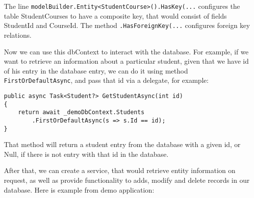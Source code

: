 The line \lstinline{modelBuilder.Entity<StudentCourse>().HasKey(...} configures the table StudentCourses to have a composite key, that would consist of fields StudentId and CourseId. The method \lstinline{.HasForeignKey(...} configures foreign key relations.

Now we can use this dbContext to interact with the database. For example, if we want to retrieve an information about a particular student, given that we have id of his entry in the database entry, we can do it using method \lstinline{FirstOrDefaultAsync}, and pass that id via a delegate, for example:

\begin{lstlisting}
public async Task<Student?> GetStudentAsync(int id)
{
    return await _demoDbContext.Students
        .FirstOrDefaultAsync(s => s.Id == id);
}
\end{lstlisting}

That method will return a student entry from the database with a given id, or Null, if there is not entry with that id in the database.

After that, we can create a service, that would retrieve entity information on request, as well as provide functionality to adds, modify and delete records in our database. Here is example from demo application:

